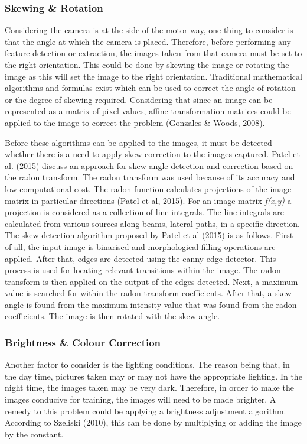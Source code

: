 \documentclass[a4paper, 12pt]{article}
\begin{document}
 \subsubsection{Skewing \& Rotation}
Considering the camera is at the side of the motor way, one thing to consider is that the angle at which the camera is placed. Therefore, before performing any feature detection or extraction, the images taken from that camera must be set to the right orientation. This could be done by skewing the image or rotating the image as this will set the image to the right orientation. Traditional mathematical algorithms and formulas exist which can be used to correct the angle of rotation or the degree of skewing required. Considering that since an image can be represented as a matrix of pixel values, affine transformation matrices could be applied to the image to correct the problem (Gonzales \& Woods, 2008).
\parskip 0.2in 

Before these algorithms can be applied to the images, it must be detected whether there is a need to apply skew correction to the images captured. Patel et al. (2015) discuss an approach for skew angle detection and correction based on the radon transform. The radon transform was used because of its accuracy and low computational cost. The radon function calculates projections of the image matrix in particular directions (Patel et al, 2015). For an image matrix \textit{f(x,y)} a projection is considered as a collection of line integrals. The line integrals are calculated from various sources along beams, lateral paths, in a specific direction. The skew detection algorithm proposed by Patel et al (2015) is as follows. First of all, the input image is binarised and morphological filling operations are applied. After that, edges are detected using the canny edge detector. This process is used for locating relevant transitions within the image. The radon transform is then applied on the output of the edges detected. Next, a maximum value is searched for within the radon transform coefficients. After that, a skew angle is found from the maximum intensity value that was found from the radon coefficients. The image is then rotated with the skew angle. 

\subsubsection{ Brightness \& Colour Correction }
Another factor to consider is the lighting conditions. The reason being that, in the day time, pictures taken may or may not have the appropriate lighting. In the night time, the images taken may be very dark. Therefore, in order to make the images conducive for training, the images will need to be made brighter. A remedy to this problem could be applying a brightness adjustment algorithm. According to Szeliski (2010), this can be done by multiplying or adding the image by the constant. 
\end{document}
